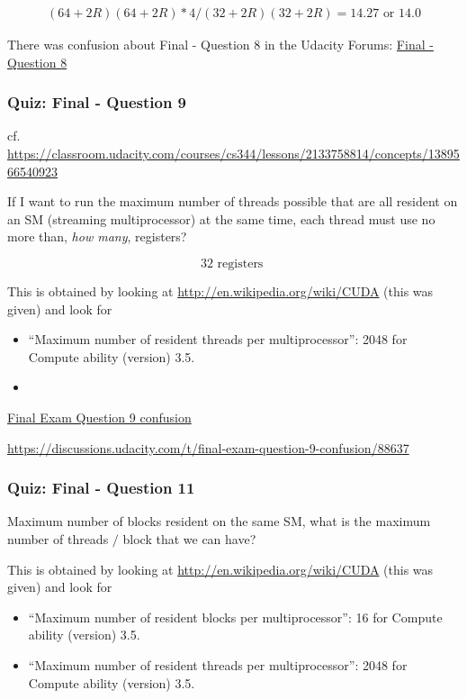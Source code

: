 \documentclass[10pt]{amsart}
\begin{document}
\begin{multicols*}{2}
\begin{equation}
\begin{gathered}
  (64 + 2R)(64 + 2R) * 4 /   (32 + 2R)(32 + 2R) = \boxed{ 14.27 \text{ or } 14.0 }
  \end{gathered}
  \end{equation}


There was confusion about Final - Question 8 in the Udacity Forums: \href{https://discussions.udacity.com/t/final-question-8/46261}{Final - Question 8}

\subsubsection{Quiz: Final - Question 9}

cf. \url{https://classroom.udacity.com/courses/cs344/lessons/2133758814/concepts/1389566540923}

If I want to run the maximum number of threads possible that are all resident on an SM (streaming multiprocessor) at the same time, each thread must use no more than, \emph{how many}, registers?

\begin{equation}
\boxed{ 32  \text{ registers } }
  \end{equation}





This is obtained by looking at \url{http://en.wikipedia.org/wiki/CUDA} (this was given) and look for
\begin{itemize}
\item ``Maximum number of resident threads per multiprocessor'': 2048 for Compute ability (version) 3.5.
\item 
  \end{itemize}

\href{https://discussions.udacity.com/t/final-exam-question-9-confusion/88637}{Final Exam Question 9 confusion}

\url{https://discussions.udacity.com/t/final-exam-question-9-confusion/88637}


\subsubsection{Quiz: Final - Question 11}

Maximum number of blocks resident on the same SM, what is the maximum number of threads $/$ block that we can have?

This is obtained by looking at \url{http://en.wikipedia.org/wiki/CUDA} (this was given) and look for
\begin{itemize}
\item ``Maximum number of resident blocks per multiprocessor'': 16 for Compute ability (version) 3.5.
\item ``Maximum number of resident threads per multiprocessor'': 2048 for Compute ability (version) 3.5.
  \end{itemize}


\end{multicols*}
\end{document}
